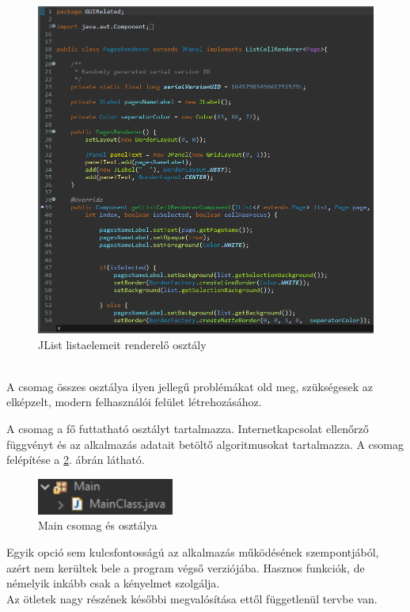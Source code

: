 \begin{figure}[h]
	\centering
	\includegraphics[scale=0.3]{images/package_guirelated_jlistrenderer_details.png}
	\caption{JList listaelemeit renderelő osztály}
	\label{fig:package_guirelated_jlistrenderer}
\end{figure}
\vspace{5pt} \\ \noindent A csomag összes osztálya ilyen jellegű problémákat old meg, szükségesek az elképzelt, modern felhasználói felület létrehozásához.


A csomag a fő futtatható osztályt tartalmazza. Internetkapcsolat ellenőrző függvényt és az alkalmazás adatait betöltő algoritmusokat tartalmazza. A csomag felépítése a \ref{fig:package_main}. ábrán látható.

\begin{figure}[h]
	\centering
	\includegraphics[scale=0.6]{images/package_main.png}
	\caption{Main csomag és osztálya}
	\label{fig:package_main}
\end{figure}


Egyik opció sem kulcsfontosságú az alkalmazás működésének szempontjából, azért nem kerültek bele a program végső verziójába. Hasznos funkciók, de némelyik inkább csak a kényelmet szolgálja.
\\Az ötletek nagy részének későbbi megvalósítása ettől függetlenül tervbe van.

